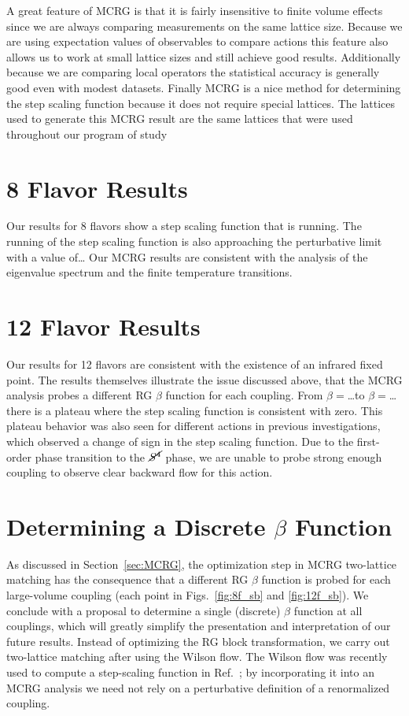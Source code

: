 \documentclass{PoS}
\newcommand{\Sb}{\ensuremath{\cancel{S^4}} }
\newcommand{\refcite}[1]{Ref.~\cite{#1}}
\newcommand{\secref}[1]{Section~\ref{#1}}
\begin{document}
A great feature of MCRG is that it is fairly insensitive to finite volume effects since we are always comparing measurements on the same lattice size.
Because we are using expectation values of observables to compare actions this feature also allows us to work at small lattice sizes and still achieve good results.
Additionally because we are comparing local operators the statistical accuracy is generally good even with modest datasets.
Finally MCRG is a nice method for determining the step scaling function because it does not require special lattices.
The lattices used to generate this MCRG result are the same lattices that were used throughout our program of study

\section{8 Flavor Results}
Our results for 8 flavors show a step scaling function that is running.
The running of the step scaling function is also approaching the perturbative limit with a value of\dots
Our MCRG results are consistent with the analysis of the eigenvalue spectrum and the finite temperature transitions.

\section{12 Flavor Results}
Our results for 12 flavors are consistent with the existence of an infrared fixed point.
The results themselves illustrate the issue discussed above, that the MCRG analysis probes a different RG $\beta$ function for each coupling.
From $\beta = $\dots to $\beta = $\dots there is a plateau where the step scaling function is consistent with zero.
This plateau behavior was also seen for different actions in previous investigations, which observed a change of sign in the step scaling function.
Due to the first-order phase transition to the \Sb phase, we are unable to probe strong enough coupling to observe clear backward flow for this action.

\section{Determining a Discrete $\beta$ Function}
As discussed in \secref{sec:MCRG}, the optimization step in MCRG two-lattice matching has the consequence that a different RG $\beta$ function is probed for each large-volume coupling (each point in Figs.~\ref{fig:8f_sb} and \ref{fig:12f_sb}).
We conclude with a proposal to determine a single (discrete) $\beta$ function at all couplings, which will greatly simplify the presentation and interpretation of our future results.
Instead of optimizing the RG block transformation, we carry out two-lattice matching after using the Wilson flow.
The Wilson flow was recently used to compute a step-scaling function in \refcite{Fodor:2012td}; by incorporating it into an MCRG analysis we need not rely on a perturbative definition of a renormalized coupling.
\end{document}
